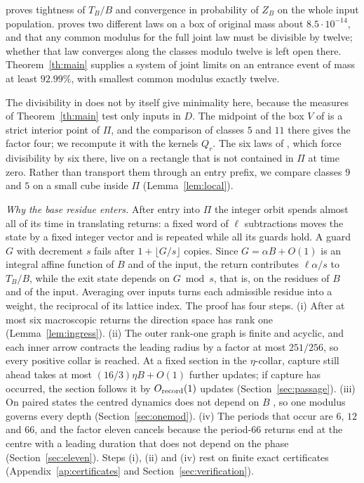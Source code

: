 \documentclass[11pt,reqno]{amsart}
\theoremstyle{definition}
\newcommand{\T}{T_B}
\newcommand{\ZB}{Z_B}
\begin{document}
\cite[Theorem~1]{G6} proves tightness of \(\T/B\) and convergence in probability
of \(\ZB\) on the whole input population. \cite[Theorem~4]{G7} proves two
different laws on a box of original mass about \(8.5\cdot10^{-14}\), and that any
common modulus for the full joint law must be divisible by twelve; whether
that law converges along the classes modulo twelve is left open there.
Theorem~\ref{th:main} supplies a system of joint limits on an entrance event
of mass at least \(92.99\%\), with smallest common modulus exactly twelve.

The divisibility in \cite{G7} does not by itself give minimality here,
because the measures of Theorem~\ref{th:main} test only inputs in \(D\). The
midpoint of the box \(V\) of \cite[Theorem~4]{G7} is a strict interior point
of \(\Pi\), and the comparison of classes \(5\) and \(11\) there gives the
factor four; we recompute it with the kernels \(Q_r\). The six laws of
\cite[Theorem~2]{G7}, which force divisibility by six there, live on a
rectangle that is not contained in \(\Pi\) at time zero. Rather than transport them
through an entry prefix, we compare classes \(9\) and \(5\) on a small cube
inside \(\Pi\) (Lemma~\ref{lem:local}).

\emph{Why the base residue enters.} After entry into \(\Pi\) the integer
orbit spends almost all of its time in translating returns: a fixed word of
\(\ell\) subtractions moves the state by a fixed integer vector and is
repeated while all its guards hold. A guard \(G\) with decrement \(s\) fails
after \(1+\lfloor G/s\rfloor\) copies. Since \(G=\alpha B+O(1)\) is an
integral affine function of \(B\) and of the input, the return contributes
\(\ell\alpha/s\) to \(T_B/B\), while the exit state depends on \(G\bmod s\),
that is, on the residues of \(B\) and of the input. Averaging over inputs
turns each admissible residue into a weight, the reciprocal of its lattice
index. The proof has four steps. (i) After at most six macroscopic returns
the direction space has rank one (Lemma~\ref{lem:ingress}). (ii) The outer rank-one graph is finite and acyclic, and each inner arrow
contracts the leading radius by a factor at most \(251/256\), so every
positive collar is reached. At a fixed section in the \(\eta\)-collar,
capture still ahead takes at most \((16/3)\eta B+O(1)\) further updates;
if capture has occurred, the section follows it by \(O_{\rm record}(1)\)
updates (Section~\ref{sec:passage}).
(iii) On paired states the centred dynamics does not depend on \(B\)
\cite[Theorem~4]{G4}, so one modulus governs every depth
(Section~\ref{sec:onemod}). (iv) The periods that occur are \(6\), \(12\)
and \(66\), and the factor eleven cancels because the period-\(66\) returns
end at the centre with a leading duration that does not depend on the
phase (Section~\ref{sec:eleven}). Steps (i), (ii) and (iv) rest on finite
exact certificates (Appendix~\ref{ap:certificates} and
Section~\ref{sec:verification}).
\end{document}
